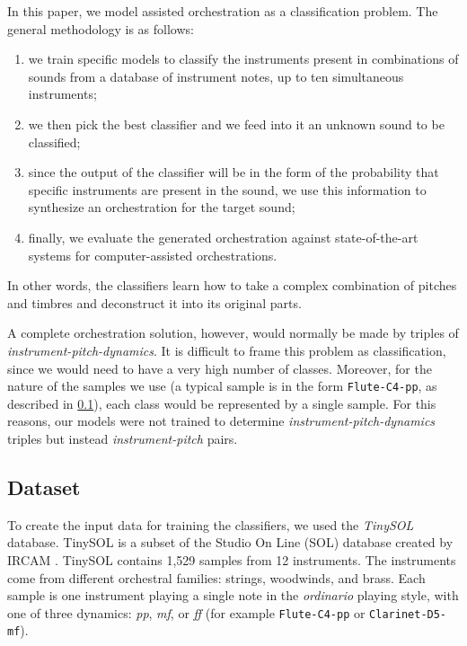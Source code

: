 \documentclass[runningheads,a4paper]{llncs}
\begin{document}
In this paper, we model assisted orchestration as a classification problem. The general methodology is as follows:
\begin{enumerate}
\item we train specific models to classify the instruments present in combinations of sounds from a database of instrument notes, up to ten simultaneous instruments;
\item we then pick the best classifier and we feed into it an unknown sound to be classified;
\item since the output of the classifier will be in the form of the probability that specific instruments are present in the sound, we use this information to synthesize an orchestration for the target sound;
\item finally, we evaluate the generated orchestration against state-of-the-art systems for computer-assisted orchestrations.
\end{enumerate}

In other words, the classifiers learn how to take a complex combination of pitches and timbres and deconstruct it into its original parts.

A complete orchestration solution, however, would normally be made by triples of \textit{instrument-pitch-dynamics}. It is difficult to frame this problem as classification, since we would need to have a very high number of classes. Moreover, for the nature of the samples we use (a typical sample is in the form \texttt{Flute-C4-pp}, as described in \ref{sec:dataset}), each class would be represented by a single sample. For this reasons, our models were not trained to determine \textit{instrument-pitch-dynamics} triples but instead \textit{instrument-pitch} pairs.


\subsection{Dataset}
\label{sec:dataset}

To create the input data for training the classifiers, we used the \emph{TinySOL} database. TinySOL is a subset of the Studio On Line (SOL) database created by IRCAM \cite{Cella2020b}. TinySOL contains 1,529 samples from 12 instruments. The instruments come from different orchestral families: strings, woodwinds, and brass. Each sample is one instrument playing a single note in the \emph{ordinario} playing style, with one of three dynamics: \textit{pp}, \textit{mf}, or \textit{ff} (for example \texttt{Flute-C4-pp} or \texttt{Clarinet-D5-mf}). 
\end{document}
